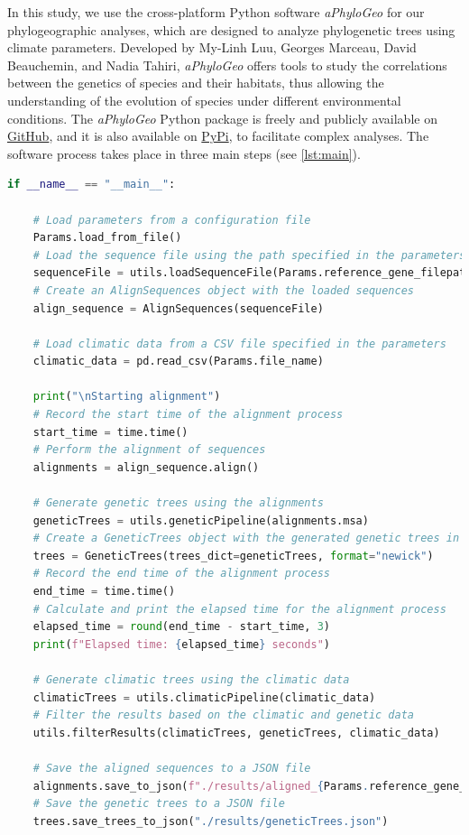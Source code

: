 In this study, we use the cross-platform Python software \textit{aPhyloGeo} for our phylogeographic analyses, which are designed to analyze phylogenetic trees using climate parameters. Developed by My-Linh Luu, Georges Marceau, David Beauchemin, and Nadia Tahiri, \textit{aPhyloGeo} offers tools to study the correlations between the genetics of species and their habitats, thus allowing the understanding of the evolution of species under different environmental conditions. The \textit{aPhyloGeo} Python package is freely and publicly available on \href{https://github.com/tahiri-lab/aPhyloGeo}{GitHub}, and it is also available on \href{https://pypi.org/project/aphylogeo/}{PyPi}, to facilitate complex analyses. The software process takes place in three main steps (see \autoref{lst:main}).

\begin{lstlisting}[label=lst:main,language=Python,caption=Main script for tutorial using the \textit{aPhyloGeo} package.]
if __name__ == "__main__":

    # Load parameters from a configuration file
    Params.load_from_file()
    # Load the sequence file using the path specified in the parameters
    sequenceFile = utils.loadSequenceFile(Params.reference_gene_filepath)
    # Create an AlignSequences object with the loaded sequences
    align_sequence = AlignSequences(sequenceFile)

    # Load climatic data from a CSV file specified in the parameters
    climatic_data = pd.read_csv(Params.file_name)

    print("\nStarting alignment")
    # Record the start time of the alignment process
    start_time = time.time()
    # Perform the alignment of sequences
    alignments = align_sequence.align()

    # Generate genetic trees using the alignments
    geneticTrees = utils.geneticPipeline(alignments.msa)
    # Create a GeneticTrees object with the generated genetic trees in Newick format
    trees = GeneticTrees(trees_dict=geneticTrees, format="newick")
    # Record the end time of the alignment process
    end_time = time.time()
    # Calculate and print the elapsed time for the alignment process
    elapsed_time = round(end_time - start_time, 3)
    print(f"Elapsed time: {elapsed_time} seconds")

    # Generate climatic trees using the climatic data
    climaticTrees = utils.climaticPipeline(climatic_data)
    # Filter the results based on the climatic and genetic data
    utils.filterResults(climaticTrees, geneticTrees, climatic_data)

    # Save the aligned sequences to a JSON file
    alignments.save_to_json(f"./results/aligned_{Params.reference_gene_file}.json")
    # Save the genetic trees to a JSON file
    trees.save_trees_to_json("./results/geneticTrees.json")
\end{lstlisting}


